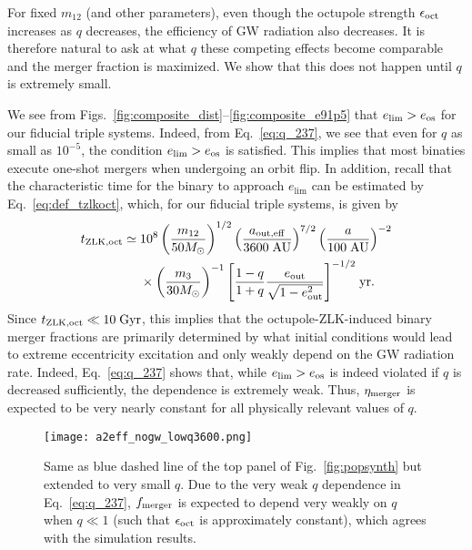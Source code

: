 \documentclass[
        fleqn,
        usenatbib,
    ]{mnras}
\newcommand*{\p}[1]{\left(#1\right)}
\begin{document}
For fixed $m_{12}$ (and other parameters), even though the octupole strength
$\epsilon_{\rm oct}$ increases as $q$ decreases, the efficiency of GW
radiation also decreases. It is therefore natural to ask at what $q$ these
competing effects become comparable and the merger fraction is maximized. We
show that this does not happen until $q$ is extremely small.

We see from Figs.~\ref{fig:composite_dist}--\ref{fig:composite_e91p5} that
$e_{\lim} > e_{\rm os}$ for our fiducial triple systems. Indeed,
from Eq.~\eqref{eq:q_237}, we see that even for $q$ as small as $10^{-5}$, the
condition $e_{\lim} > e_{\rm os}$ is satisfied. This implies that most binaties
execute one-shot mergers when undergoing an orbit flip. In addition, recall that
the characteristic time for the binary to approach $e_{\lim}$ can be estimated
by Eq.~\eqref{eq:def_tzlkoct}, which, for our fiducial triple systems, is given
by
\begin{align}
    t_{\rm ZLK, oct} \simeq{}& 10^8
        \p{\frac{m_{12}}{50M_{\odot}}}^{1/2}
        \p{\frac{a_{\rm out, eff}}{3600\;\mathrm{AU}}}^{7/2}
        \p{\frac{a}{100\;\mathrm{AU}}}^{-2}\nonumber\\
        &\times \p{\frac{m_3}{30M_{\odot}}}^{-1}
            \Bigg[\frac{1 - q}{1 + q}\frac{e_{\rm out}}{\sqrt{1 - e_{\rm out}^2}}
            \Bigg]^{-1/2}
            \;\mathrm{yr}.
\end{align}
Since $t_{\rm ZLK, oct } \ll 10\;\mathrm{Gyr}$, this implies that the
octupole-ZLK-induced binary merger fractions are primarily determined by what
initial conditions would lead to extreme eccentricity excitation and only weakly
depend on the GW radiation rate. Indeed, Eq.~\eqref{eq:q_237} shows that, while
$e_{\lim} > e_{\rm os}$ is indeed violated if $q$ is decreased sufficiently, the
dependence is extremely weak. Thus, $\eta_{\rm merger}$ is expected to be very
nearly constant for all physically relevant values of $q$.
\begin{figure}
    \centering
    \texttt{[image: a2eff\_nogw\_lowq3600.png]}
    \caption{Same as blue dashed line of the top panel of
    Fig.~\ref{fig:popsynth} but extended to very small $q$. Due to the very weak
    $q$ dependence in Eq.~\eqref{eq:q_237}, $f_{\rm merger}$ is expected to
    depend very weakly on $q$ when $q \ll 1$ (such that $\epsilon_{\rm oct}$ is
    approximately constant), which agrees with the simulation
    results.}\label{fig:popsynth_lowq}
\end{figure}
\end{document}
